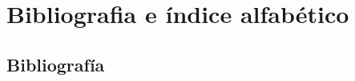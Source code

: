 \documentclass[12pt,fleqn]{book} %
\begin{document}
\tableofcontents %

\listoffigures %

\renewcommand{\listtablename}{Índice de Tablas}
\listoftables %

\cleardoublepage %

\pagestyle{fancy} %






\part*{Bibliografia e índice alfabético}

\chapter*{Bibliografía}
 
\end{document}
